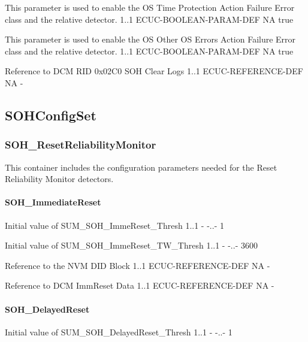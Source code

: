 {
    {This parameter is used to enable the OS Time Protection Action Failure Error class and the relative detector.}
    {1..1}
    {ECUC-BOOLEAN-PARAM-DEF}
    {NA}
    {true}
}


{
    {This parameter is used to enable the OS Other OS Errors Action Failure Error class and the relative detector.}
    {1..1}
    {ECUC-BOOLEAN-PARAM-DEF}
    {NA}
    {true}
}



{
{Reference to DCM RID 0x02C0 SOH Clear Logs}
{1..1}
{ECUC-REFERENCE-DEF}
{NA}
{-}}


\subsection{SOHConfigSet}
\label{subsection:SOHConfigSet}

\subsubsection{SOH\_ResetReliabilityMonitor}
This container includes the configuration parameters needed for the Reset Reliability Monitor detectors.

\paragraph{SOH\_ImmediateReset}
{
{Initial value of SUM_SOH_ImmeReset_Thresh}
{1..1}
{-}
{-..-}
{1}}

{
{Initial value of SUM_SOH_ImmeReset_TW_Thresh}
{1..1}
{-}
{-..-}
{3600}}

{
{Reference to the NVM DID Block}
{1..1}
{ECUC-REFERENCE-DEF}
{NA}
{-}}

{
{Reference to DCM ImmReset Data}
{1..1}
{ECUC-REFERENCE-DEF}
{NA}
{-}}

\paragraph{SOH\_DelayedReset}

{
{Initial value of SUM_SOH_DelayedReset_Thresh}
{1..1}
{-}
{-..-}
{1}}

